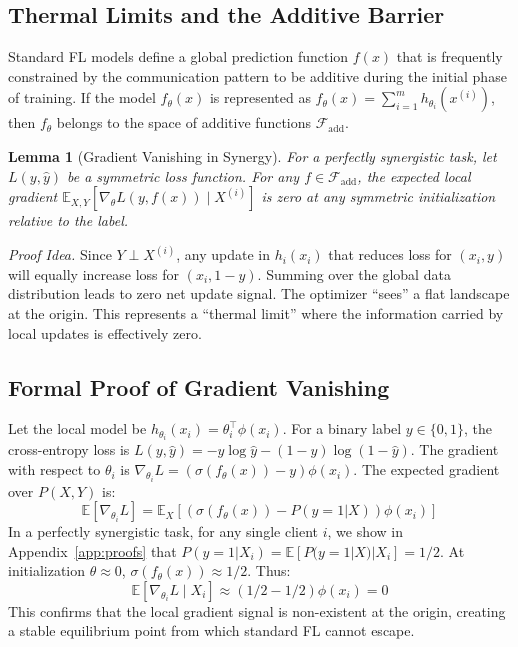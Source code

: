 \documentclass{article}
\theoremstyle{plain}
\newtheorem{lemma}[theorem]{Lemma}
\theoremstyle{definition}
\newcommand{\E}{\mathbb{E}}
\begin{document}
\subsection{Thermal Limits and the Additive Barrier}
Standard FL models define a global prediction function $f(x)$ that is frequently constrained by the communication pattern to be additive during the initial phase of training. If the model $f_\theta(x)$ is represented as $f_\theta(x) = \sum_{i=1}^m h_{\theta_i}(x^{(i)})$, then $f_\theta$ belongs to the space of additive functions $\mathcal{F}_{\text{add}}$.
\begin{lemma}[Gradient Vanishing in Synergy]
For a perfectly synergistic task, let $L(y, \hat{y})$ be a symmetric loss function. For any $f \in \mathcal{F}_{\text{add}}$, the expected local gradient $\E_{X, Y}[\nabla_\theta L(y, f(x)) \mid X^{(i)}]$ is zero at any symmetric initialization relative to the label.
\end{lemma}
\emph{Proof Idea.} Since $Y \perp X^{(i)}$, any update in $h_i(x_i)$ that reduces loss for $(x_i, y)$ will equally increase loss for $(x_i, 1-y)$. Summing over the global data distribution leads to zero net update signal. The optimizer ``sees'' a flat landscape at the origin. This represents a ``thermal limit'' where the information carried by local updates is effectively zero.

\subsection{Formal Proof of Gradient Vanishing}
Let the local model be $h_{\theta_i}(x_i) = \theta_i^\top \phi(x_i)$. For a binary label $y \in \{0, 1\}$, the cross-entropy loss is $L(y, \hat{y}) = -y \log \hat{y} - (1-y) \log(1-\hat{y})$. The gradient with respect to $\theta_i$ is $\nabla_{\theta_i} L = (\sigma(f_\theta(x)) - y) \phi(x_i)$.
The expected gradient over $P(X, Y)$ is:
\begin{equation}
    \E[\nabla_{\theta_i} L] = \E_X [ (\sigma(f_\theta(x)) - P(y=1|X)) \phi(x_i) ]
\end{equation}
In a perfectly synergistic task, for any single client $i$, we show in Appendix~\ref{app:proofs} that $P(y=1|X_i) = \E[P(y=1|X)|X_i] = 1/2$.
At initialization $\theta \approx 0$, $\sigma(f_\theta(x)) \approx 1/2$. Thus:
\begin{equation}
    \E[\nabla_{\theta_i} L \mid X_i] \approx (1/2 - 1/2) \phi(x_i) = 0
\end{equation}
This confirms that the local gradient signal is non-existent at the origin, creating a stable equilibrium point from which standard FL cannot escape.
\end{document}
